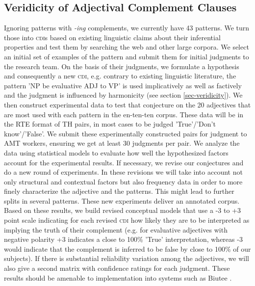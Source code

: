 \documentclass[10pt]{article}
\begin{document}
 
\vspace{-.1in}
\subsection{Veridicity of Adjectival Complement Clauses}

\vspace {-3mm}

Ignoring patterns with \emph{-ing} complements, we currently have 43 patterns. We turn those into \textsc{cdi}s based on existing linguistic claims about their inferential properties and test them by searching the web and other large corpora. We select an initial set of examples of the pattern and submit them for initial judgments to the research team. On the basis of their judgments, we formulate a hypothesis and consequently a new \textsc{cdi}, e.g. contrary to existing linguistic literature, the pattern 'NP be evaluative ADJ to VP' is used implicatively as well as factively and the judgment is influenced by harmonicity (see section \ref{sec-veridicity}). We then construct experimental data to test that conjecture on the 20 adjectives that are most used with each pattern in the en-ten-ten corpus. These data will be in the RTE format of TH pairs, in most cases to be judged 'True'/'Don't know'/'False'. We submit these experimentally constructed pairs for judgment to AMT workers, ensuring we get at least 30 judgments per pair. We analyze the data using statistical models to evaluate how well the hypothesized factors account for the experimental results. If necessary, we revise our conjectures and do a new round of experiments. In these revisions we will take into account not only structural and contextual factors but also frequency data in order to more finely characterize the adjective and the patterns. This might lead to further splits in several patterns. These new experiments deliver an annotated corpus. Based on these results, we build revised conceptual models that use a -3 to +3 point scale indicating for each revised \textsc{cdi} how likely they are to be interpreted as implying the truth of their complement (e.g. for evaluative adjectives with negative polarity +3 indicates a close to 100\% 'True' interpretation, whereas -3 would indicate that the complement is inferred to be false by close to 100\% of our subjects). If there is substantial reliability variation among the adjectives, we will also give a second matrix with confidence ratings for each judgment.  These results should be amenable to implementation into systems such as Biutee \cite{biutee}.
\end{document}
